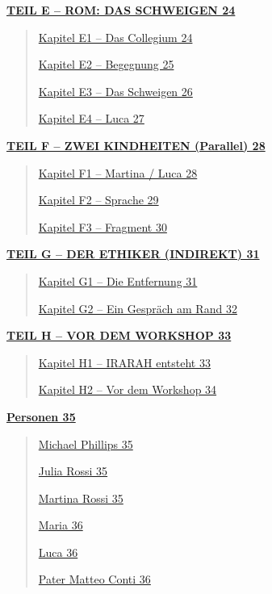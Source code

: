 \documentclass[
]{article}
\begin{document}
\hyperref[teil-e-rom-das-schweigen]{\textbf{TEIL E -- ROM: DAS SCHWEIGEN 24}}

\begin{quote}
\hyperref[kapitel-e1-das-collegium]{Kapitel E1 -- Das Collegium 24}

\hyperref[kapitel-e2-begegnung]{Kapitel E2 -- Begegnung 25}

\hyperref[kapitel-e3-das-schweigen]{Kapitel E3 -- Das Schweigen 26}

\hyperref[kapitel-e4-luca]{Kapitel E4 -- Luca 27}
\end{quote}

\hyperref[teil-f-zwei-kindheiten-parallel]{\textbf{TEIL F -- ZWEI KINDHEITEN (Parallel) 28}}

\begin{quote}
\hyperref[kapitel-f1-martina-luca]{Kapitel F1 -- Martina / Luca 28}

\hyperref[kapitel-f2-sprache]{Kapitel F2 -- Sprache 29}

\hyperref[kapitel-f3-fragment]{Kapitel F3 -- Fragment 30}
\end{quote}

\hyperref[teil-g-der-ethiker-indirekt]{\textbf{TEIL G -- DER ETHIKER (INDIREKT) 31}}

\begin{quote}
\hyperref[kapitel-g1-die-entfernung]{Kapitel G1 -- Die Entfernung 31}

\hyperref[kapitel-g2-ein-gespruxe4ch-am-rand]{Kapitel G2 -- Ein Gespräch am Rand 32}
\end{quote}

\hyperref[teil-h-vor-dem-workshop]{\textbf{TEIL H -- VOR DEM WORKSHOP 33}}

\begin{quote}
\hyperref[kapitel-h1-irarah-entsteht]{Kapitel H1 -- IRARAH entsteht 33}

\hyperref[kapitel-h2-vor-dem-workshop]{Kapitel H2 -- Vor dem Workshop 34}
\end{quote}

\hyperref[personen]{\textbf{Personen 35}}

\begin{quote}
\hyperref[michael-phillips]{Michael Phillips 35}

\hyperref[julia-rossi]{Julia Rossi 35}

\hyperref[martina-rossi]{Martina Rossi 35}

\hyperref[maria]{Maria 36}

\hyperref[luca]{Luca 36}

\hyperref[pater-matteo-conti]{Pater Matteo Conti 36}
\end{quote}
\end{document}
